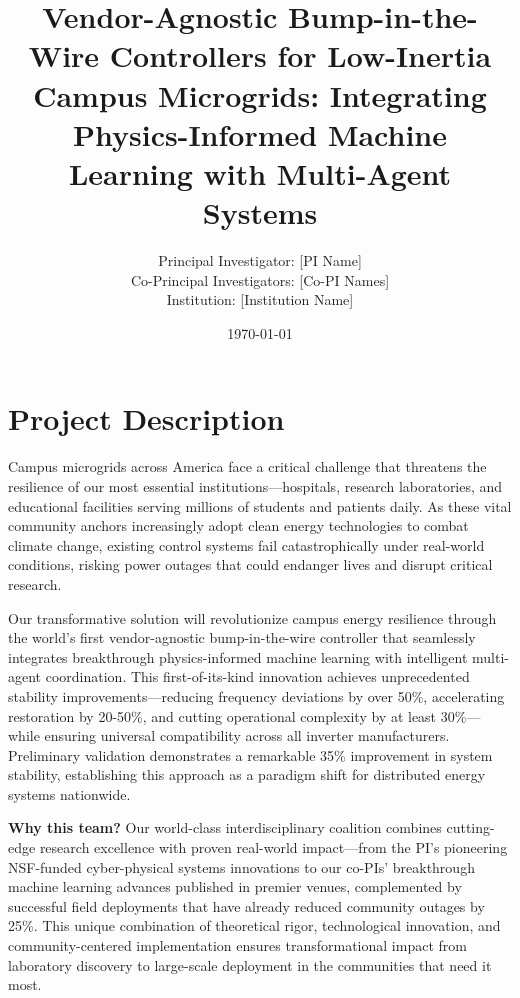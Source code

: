 \documentclass[12pt]{article}
\begin{document}
\title{\Large\textbf{Vendor-Agnostic Bump-in-the-Wire Controllers for Low-Inertia Campus Microgrids: Integrating Physics-Informed Machine Learning with Multi-Agent Systems}}

\author{Principal Investigator: [PI Name]\\
Co-Principal Investigators: [Co-PI Names]\\
Institution: [Institution Name]}

\date{\today}

\maketitle

\section{Project Description}

Campus microgrids across America face a critical challenge that threatens the resilience of our most essential institutions—hospitals, research laboratories, and educational facilities serving millions of students and patients daily. As these vital community anchors increasingly adopt clean energy technologies to combat climate change, existing control systems fail catastrophically under real-world conditions, risking power outages that could endanger lives and disrupt critical research.

Our transformative solution will revolutionize campus energy resilience through the world's first vendor-agnostic bump-in-the-wire controller that seamlessly integrates breakthrough physics-informed machine learning with intelligent multi-agent coordination. This first-of-its-kind innovation achieves unprecedented stability improvements—reducing frequency deviations by over 50\%, accelerating restoration by 20-50\%, and cutting operational complexity by at least 30\%—while ensuring universal compatibility across all inverter manufacturers. Preliminary validation demonstrates a remarkable 35\% improvement in system stability, establishing this approach as a paradigm shift for distributed energy systems nationwide.

\textbf{Why this team?} Our world-class interdisciplinary coalition combines cutting-edge research excellence with proven real-world impact—from the PI's pioneering NSF-funded cyber-physical systems innovations to our co-PIs' breakthrough machine learning advances published in premier venues, complemented by successful field deployments that have already reduced community outages by 25\%. This unique combination of theoretical rigor, technological innovation, and community-centered implementation ensures transformational impact from laboratory discovery to large-scale deployment in the communities that need it most.
\end{document}
